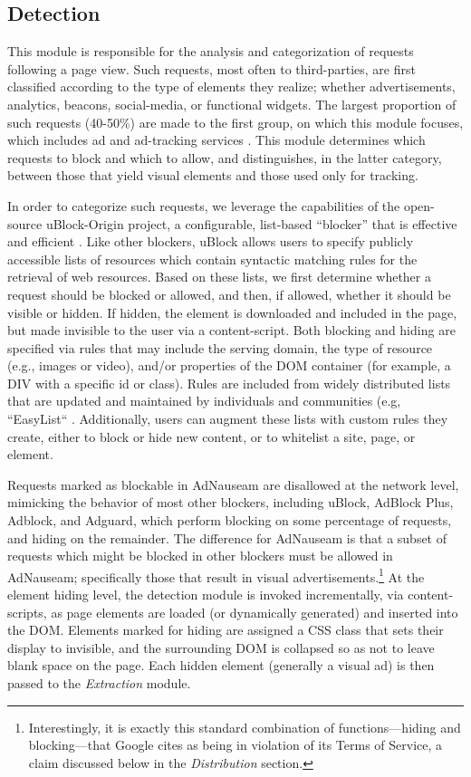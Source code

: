 \documentclass[conference]{IEEEtran}
\begin{document}
\subsection{Detection}

This module is responsible for the analysis and categorization of requests following a page view. Such requests, most often to third-parties, are first classified according to the type of elements they realize; whether advertisements, analytics, beacons, social-media, or functional widgets. The largest proportion of such requests (40-50\%) are made to the first group, on which this module focuses, which includes ad and ad-tracking services \cite{Wills}. This module determines which requests to block and which to allow, and distinguishes, in the latter category, between those that yield visual elements and those used only for tracking.

In order to categorize such requests, we leverage the capabilities of the open-source uBlock-Origin \cite{Gorhill} project, a configurable, list-based “blocker” that is effective and efficient \cite{Wills}. Like other blockers, uBlock allows users to specify publicly accessible lists of resources which contain syntactic matching rules for the retrieval of web resources. Based on these lists, we first determine whether a request should be blocked or allowed, and then, if allowed, whether it should be visible or hidden. If hidden, the element is downloaded and included in the page, but made invisible to the user via a content-script. Both blocking and hiding are specified via rules that may include the serving domain, the type of resource (e.g., images or video), and/or properties of the DOM container (for example, a DIV with a specific id or class). Rules are included from widely distributed lists that are updated and maintained by individuals and communities (e.g, “EasyList“ \cite{EasyList}. Additionally, users can augment these lists with custom rules they create, either to block or hide new content, or to whitelist a site, page, or element.

Requests marked as blockable in AdNauseam are disallowed at the network level, mimicking the behavior of most other blockers, including uBlock, AdBlock Plus, Adblock, and Adguard, which perform blocking on some percentage of requests, and hiding on the remainder. The difference for AdNauseam is that a subset of requests which might be blocked in other blockers must be allowed in AdNauseam; specifically those that result in visual advertisements.\footnote{Interestingly, it is exactly this standard combination of functions---hiding and blocking---that Google cites as being in violation of its Terms of Service, a claim discussed below in the \emph{Distribution} section.} At the element hiding level, the detection module is invoked incrementally, via content-scripts, as page elements are loaded (or dynamically generated) and inserted into the DOM. Elements marked for hiding are assigned a CSS class that sets their display to invisible, and the surrounding DOM is collapsed so as not to leave blank space on the page. Each hidden element (generally a visual ad) is then passed to the \emph{Extraction} module.
\end{document}
